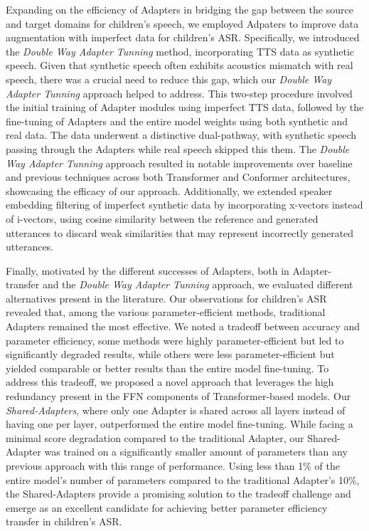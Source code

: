 Expanding on the efficiency of Adapters in bridging the gap between the source and target domains for children's speech, we employed Adpaters to improve data augmentation with imperfect data for children's \ac{ASR}. Specifically, we introduced the \textit{Double Way Adapter Tunning} method, incorporating \ac{TTS} data as synthetic speech. Given that synthetic speech often exhibits acoustics mismatch with real speech, there was a crucial need to reduce this gap, which our \textit{Double Way Adapter Tunning} approach helped to address. This two-step procedure involved the initial training of Adapter modules using imperfect \ac{TTS} data, followed by the fine-tuning of Adapters and the entire model weights using both synthetic and real data. The data underwent a distinctive dual-pathway, with synthetic speech passing through the Adapters while real speech skipped this them. The \textit{Double Way Adapter Tunning} approach resulted in notable improvements over baseline and previous techniques across both Transformer and Conformer architectures, showcasing the efficacy of our approach. Additionally, we extended speaker embedding filtering of imperfect synthetic data by incorporating x-vectors instead of i-vectors, using cosine similarity between the reference and generated utterances to discard weak similarities that may represent incorrectly generated utterances.

Finally, motivated by the different successes of Adapters, both in Adapter-transfer and the \textit{Double Way Adapter Tunning} approach, we evaluated different alternatives present in the literature. Our observations for children's \ac{ASR} revealed that, among the various parameter-efficient methods, traditional Adapters remained the most effective. We noted a tradeoff between accuracy and parameter efficiency, some methods were highly parameter-efficient but led to significantly degraded results, while others were less parameter-efficient but yielded comparable or better results than the entire model fine-tuning. To address this tradeoff, we proposed a novel approach that leverages the high redundancy present in the \ac{FFN} components of Transformer-based models. Our \textit{Shared-Adapters}, where only one Adapter is shared across all layers instead of having one per layer, outperformed the entire model fine-tuning. While facing a minimal score degradation compared to the traditional Adapter, our Shared-Adapter was trained on a significantly smaller amount of parameters than any previous approach with this range of performance. Using less than 1\% of the entire model's number of parameters compared to the traditional Adapter's 10\%, the Shared-Adapters provide a promising solution to the tradeoff challenge and emerge as an excellent candidate for achieving better parameter efficiency transfer in children's \ac{ASR}.

